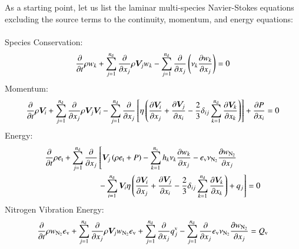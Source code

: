 \documentclass{warpdoc}
\newcommand{\alb}{\vspace{0.2cm}\\} %
\newcommand{\nd}{{{n}_{\rm d}}}
\newcommand{\ns}{{{n}_{\rm s}}}
\newcommand{\mfd}{\displaystyle}
\newcommand{\ev}{e_{\rm v}}
\newcommand{\et}{{e_{\rm t}}}
\begin{document}
As a starting point, let us list the laminar multi-species Navier-Stokes equations excluding the source terms to the continuity, momentum, and energy equations:
\\  \\Species Conservation:
\begin{displaymath}
  \mfd\frac{\partial}{\partial t}  {\rho}  {w_k}
      +  \sum_{j=1}^{\nd} \frac{\partial }{\partial x_j}
        {\rho} {\bm{V}_j} {w_k}
      -  \sum_{j=1}^{\nd} \frac{\partial }{\partial x_j}
            \left(  {\nu_k}
              \frac{\partial {w_k}}{\partial x_j} \right)
      = 0
\end{displaymath}
%
Momentum:
\begin{displaymath}
  \mfd\frac{\partial}{\partial t}  {\rho}  {\bm{V}_i}
      +  \sum_{j=1}^{\nd} \frac{\partial }{\partial x_j}
             {\rho} {\bm{V}_j} {\bm{V}_i}
      - \sum_{j=1}^{\nd} \frac{\partial }{\partial x_j}
           \left[ {\eta}
          \left(
                \frac{\partial {\bm{V}_i}}{\partial x_j}
              + \frac{\partial {\bm{V}_j}}{\partial x_i}
              - \frac{2}{3} \delta_{ij} \sum_{k=1}^\nd \frac{\partial {\bm{V}_k}}{\partial x_k}
          \right)\right]
      +  \frac{\partial P}{\partial x_i}
      =  0
\end{displaymath}
%
%
%
Energy:
%
\begin{align*}
    \mfd\frac{\partial}{\partial t}  {\rho} \et
     + \sum_{j=1}^{\nd} \frac{\partial}{\partial x_j} &\left[ {\bm{V}_j}
       \left(
            {\rho} \et +{P}
       \right)
    -\sum_{k=1}^{\ns} {h_k} {\nu_k} \frac{\partial {w_k}}{\partial x_j}
    -\ev {\nu_{\rm N_2}} \frac{\partial {w_{\rm N_2}}}{\partial x_j}
    \right. \alb &\left. 
      -\sum_{i=1}^{\nd}
         {\bm{V}_i} 
            {\eta} \left(
               \frac{\partial {\bm{V}_i}}{\partial x_j}
               +\frac{\partial {\bm{V}_j}}{\partial x_i}
               -\frac{2}{3} \delta_{ij} \sum_{k=1}^\nd \frac{\partial {\bm{V}_k}}{\partial x_k}
            \right)
      \mfd+ q_j
      \right]
      = 0
\end{align*}
%
Nitrogen Vibration Energy:
\begin{displaymath}
  \mfd\frac{\partial}{\partial t}  {\rho}  w_{\rm N_2} {\ev}
      +  \sum_{j=1}^{\nd} \frac{\partial }{\partial x_j}
        {\rho}  {\bm{V}_j} w_{\rm N_2} \ev
      + \sum_{j=1}^{\nd}\frac{\partial }{\partial x_j} q^{\rm v}_j
      - \sum_{j=1}^{\nd}\frac{\partial }{\partial x_j} e_{\rm v} \nu_{\rm N_2} \frac{\partial w_{\rm N_2}}{\partial x_j}
      = Q_{\rm v}
\end{displaymath}
\end{document}
